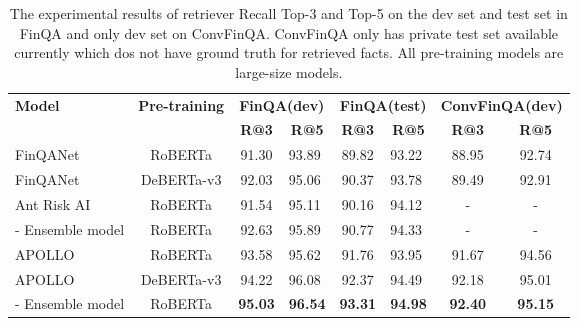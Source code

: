 \documentclass[11pt]{article}
\begin{document}
\begin{table*}[t]
\centering
\begin{tabular}{lc|cc|cc|cc}
\hline
\multirow{2}{*}{\textbf{Model}} & \multirow{2}{*}{\textbf{Pre-training}} & \multicolumn{2}{c|}{\textbf{FinQA(dev)}} & \multicolumn{2}{c|}{\textbf{FinQA(test)}} & \multicolumn{2}{c}{\textbf{ConvFinQA(dev)}} \\
                       &                                 & \textbf{R@3}  & \textbf{R@5}                     & \textbf{R@3}   & \textbf{R@5}                     & \textbf{R@3}              & \textbf{R@5}             \\ \hline
\multicolumn{1}{l}{FinQANet~\cite{chen2021finqa} } & \multicolumn{1}{c|}{RoBERTa}          & 91.30    & \multicolumn{1}{l|}{93.89}  & 89.82    & \multicolumn{1}{l|}{93.22}  & 88.95                & 92.74              \\
\multicolumn{1}{l}{FinQANet~\cite{chen2021finqa}}  & \multicolumn{1}{c|}{DeBERTa-v3}           &  92.03    & \multicolumn{1}{l|}{95.06}   &   90.37    & \multicolumn{1}{l|}{93.78}   &      89.49            &    92.91             \\
\multicolumn{1}{l}{Ant Risk AI~\cite{zhang2022robustly} }  & \multicolumn{1}{c|}{RoBERTa}           & 91.54     & \multicolumn{1}{l|}{95.11}   &   90.16    & \multicolumn{1}{l|}{94.12}   &      -            &      -           \\
\multicolumn{1}{l}{- Ensemble model}  & \multicolumn{1}{c|}{RoBERTa}           &   92.63   & \multicolumn{1}{l|}{95.89}   &  90.77     & \multicolumn{1}{l|}{94.33}   &          -        &        -         \\ \hline
\multicolumn{1}{l}{APOLLO}  & \multicolumn{1}{c|}{RoBERTa}           &  93.58    & \multicolumn{1}{l|}{95.62}   &    91.76   & \multicolumn{1}{l|}{93.95}   &          91.67        &       94.56          \\
\multicolumn{1}{l}{APOLLO}  & \multicolumn{1}{c|}{DeBERTa-v3}           &  94.22    & \multicolumn{1}{l|}{96.08}   &   92.37    & \multicolumn{1}{l|}{94.49}   &      92.18            &      95.01           \\
\multicolumn{1}{l}{- Ensemble model}  & \multicolumn{1}{c|}{RoBERTa}           &  \textbf{95.03}    & \multicolumn{1}{l|}{\textbf{96.54}}   &   \textbf{93.31}   & \multicolumn{1}{l|}{\textbf{94.98}}   &    \textbf{92.40}              &      \textbf{95.15}           \\ \hline
\end{tabular}
\caption{The experimental results of retriever Recall Top-3 and Top-5 on the dev set and test set in FinQA and only dev set on ConvFinQA. ConvFinQA only has private test set available currently which dos not have ground truth for retrieved facts. All pre-training models are large-size models.}
\label{table:retriever}
\end{table*}
\end{document}
